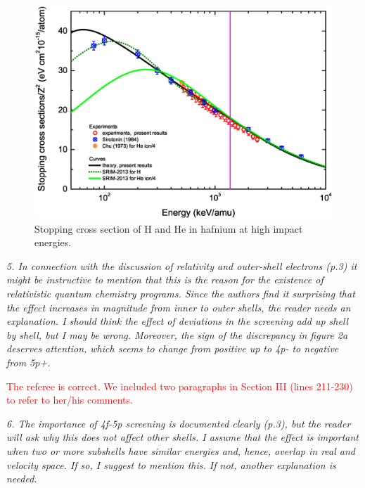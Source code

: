 \documentclass[a4paper,10pt]{article}
\def\reviewer#1{\vspace{0.35cm}\textsl{#1}}
\def\reply#1{\vspace{0.1cm}\textcolor{red}{#1}}
\begin{document}
\begin{figure}[!t]
\centering
\includegraphics[width=12.cm]{Fig_HeHf.eps}
\caption{Stopping cross section of H and He in hafnium at high impact energies.}
\label{HeHf}
\end{figure}

\reviewer{5. In connection with the discussion of relativity and 
outer-shell electrons (p.3) it might be instructive to mention that 
this is the reason for the existence of relativistic quantum chemistry
programs. Since the authors find it surprising that the effect increases
in magnitude from inner to outer shells, the reader needs an
explanation. I should think the effect of deviations in the screening
add up shell by shell, but I may be wrong. Moreover, the sign of the
discrepancy in figure 2a deserves attention, which seems to change from
positive up to 4p- to negative from 5p+.}

\reply{The referee is correct. We included two paragraphs in Section III
(lines 211-230) to refer to her/his comments.}

\reviewer{6. The importance of 4f-5p screening is documented clearly 
(p.3), but the reader will ask why this does not affect other shells. 
I assume that the effect is important when two or more subshells have
similar energies and, hence, overlap in real and velocity space. If so,
I suggest to mention this. If not, another explanation is needed.}
\end{document}
